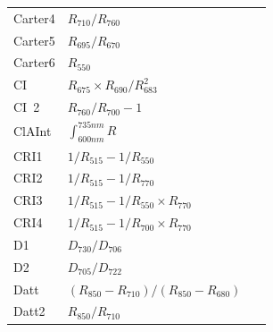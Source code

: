 \documentclass[remotesensing,article,accept,moreauthors,pdftex]{Definitions/mdpi}
\begin{document}
\begin{paracol}{2}
\begin{specialtable}[H]
{\begin{tabular}{lll}
		Carter4         & $R_{710}/R_{760}$                                                                                    &~\cite{carter1994}             \\
		Carter5         & $R_{695}/R_{670}$                                                                                    &~\cite{carter1994}             \\
		Carter6         & $R_{550}$                                                                                            &~\cite{carter1994}             \\
		CI              & $R_{675}\times R_{690}/R_{683}^2$                                                                    &~\cite{zarco-tejada2003}      \\
		CI~2             & $R_{760}/R_{700}-1$                                                                                  &~\cite{gitelson2003}           \\
		ClAInt          & $\int_{600 nm}^{735 nm} R$                                                                           &~\cite{oppelt2004}             \\
		CRI1            & $1/R_{515}-1/R_{550}$                                                                                &~\cite{gitelson2003}           \\
		CRI2            & $1/R_{515}-1/R_{770}$                                                                                &~\cite{gitelson2003}           \\
		CRI3            & $1/R_{515}-1/R_{550}\times R_{770}$                                                                  &~\cite{gitelson2003}           \\
		CRI4            & $1/R_{515}-1/R_{700}\times R_{770}$                                                                  &~\cite{gitelson2003}           \\
		D1              & $D_{730}/D_{706}$                                                                                    &~\cite{zarco-tejada2003}      \\
		D2              & $D_{705}/D_{722}$                                                                                    &~\cite{zarco-tejada2003}      \\
		Datt            & $(R_{850}-R_{710})/(R_{850}-R_{680})$                                                                &~\cite{datt1999}               \\
		Datt2           & $R_{850}/R_{710}$                                                                                    &~\cite{datt1999}               \\

\end{tabular}}
\end{specialtable}
\end{paracol}
\end{document}
